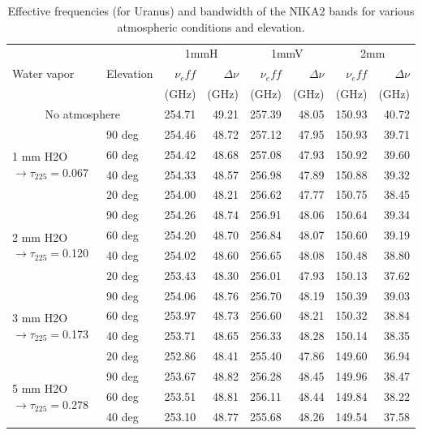 \begin{table}[h]
\caption{Effective frequencies (for Uranus) and bandwidth of the NIKA2 bands for
  various atmospheric conditions and elevation.}
\label{tab:bandwidths}
\begin{tabular}{|l|l|r|r|r|r|r|r|}
\hline 
\multirow{3}{*}{Water vapor} & \multirow{3}{*}{Elevation} & \multicolumn{2}{|c|}{1mmH} & \multicolumn{2}{|c|}{1mmV} & \multicolumn{2}{|c|}{2mm} \\
 & & $\nu_eff$ & $\Delta \nu$  & $\nu_eff$ & $\Delta \nu$  & $\nu_eff$ & $\Delta \nu$ \\
 & & (GHz) & (GHz)  & (GHz)  & (GHz)   & (GHz)  & (GHz)  \\
\hline
\multicolumn{2}{|c|}{No atmosphere} & 254.71 & 49.21 & 257.39 & 48.05 & 150.93 & 40.72 \\
\hline
\multirow{4}{*}{1 mm H2O $\rightarrow \tau_{225}=$0.067} & 90 deg &  254.46 & 48.72 & 257.12 & 47.95 & 150.93 & 39.71 \\
 & 60 deg & 254.42 & 48.68 & 257.08 & 47.93 & 150.92 & 39.60 \\
 & 40 deg & 254.33 & 48.57 & 256.98 & 47.89 & 150.88 & 39.32 \\
 & 20 deg & 254.00 & 48.21 & 256.62 & 47.77 & 150.75 & 38.45 \\
\hline
\multirow{4}{*}{2 mm H2O $\rightarrow \tau_{225}=$0.120} & 90 deg &  254.26 & 48.74 & 256.91 & 48.06 & 150.64 & 39.34 \\
 & 60 deg & 254.20 & 48.70 & 256.84 & 48.07 & 150.60 & 39.19 \\
 & 40 deg & 254.02 & 48.60 & 256.65 & 48.08 & 150.48 & 38.80 \\
 & 20 deg & 253.43 & 48.30 & 256.01 & 47.93 & 150.13 & 37.62 \\
\hline
\multirow{4}{*}{3 mm H2O $\rightarrow \tau_{225}=$0.173} & 90 deg &  254.06 & 48.76 & 256.70 & 48.19 & 150.39 & 39.03 \\
 & 60 deg & 253.97 & 48.73 & 256.60 & 48.21 & 150.32 & 38.84 \\
 & 40 deg & 253.71 & 48.65 & 256.33 & 48.28 & 150.14 & 38.35 \\
 & 20 deg & 252.86 & 48.41 & 255.40 & 47.86 & 149.60 & 36.94 \\
\hline
\multirow{4}{*}{5 mm H2O $\rightarrow \tau_{225}=$0.278} & 90 deg &  253.67 & 48.82 & 256.28 & 48.45 & 149.96 & 38.47 \\
 & 60 deg & 253.51 & 48.81 & 256.11 & 48.44 & 149.84 & 38.22 \\
 & 40 deg & 253.10 & 48.77 & 255.68 & 48.26 & 149.54 & 37.58 \\

\end{tabular}
\end{table}
